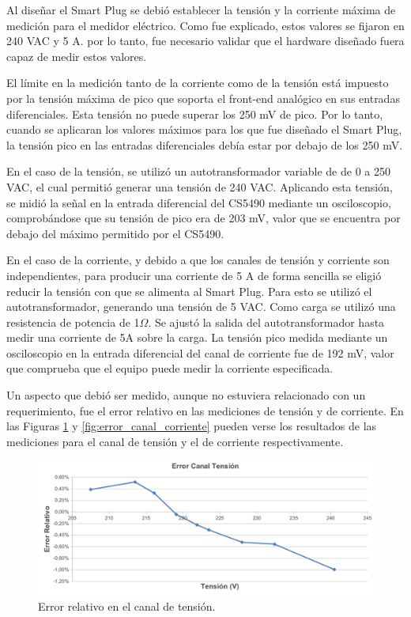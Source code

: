 Al diseñar el Smart Plug se debió establecer la tensión y la corriente máxima de medición para el medidor eléctrico. Como fue explicado, estos valores se fijaron en 240 VAC y 5 A. por lo tanto, fue necesario validar que el hardware diseñado fuera capaz de medir estos valores.

El límite en la medición tanto de la corriente como de la tensión está impuesto por la tensión máxima de pico que soporta el front-end analógico en sus entradas diferenciales. Esta tensión no puede superar los 250 mV de pico. Por lo tanto, cuando se aplicaran los valores máximos para los que fue diseñado el Smart Plug, la tensión pico en las entradas diferenciales debía estar por debajo de los 250 mV.

En el caso de la tensión, se utilizó un autotransformador variable de de 0 a 250 VAC, el cual permitió generar una tensión de 240 VAC. Aplicando esta tensión, se midió la señal en la entrada diferencial del CS5490 mediante un osciloscopio, comprobándose que su tensión de pico era de 203 mV, valor que se encuentra por debajo del máximo permitido por el CS5490.

En el caso de la corriente, y debido a que los canales de tensión y corriente son independientes, para producir una corriente de 5 A de forma sencilla se eligió reducir la tensión con que se alimenta al Smart Plug. Para esto se utilizó el autotransformador, generando una tensión de 5 VAC. Como carga se utilizó una resistencia de potencia de 1$\Omega$. Se ajustó la salida del autotransformador hasta medir una corriente de 5A sobre la carga. La tensión pico medida mediante un osciloscopio en la entrada diferencial del canal de corriente fue de 192 mV, valor que comprueba que el equipo puede medir la corriente especificada.

Un aspecto que debió ser medido, aunque no estuviera relacionado con un requerimiento, fue el error relativo en las mediciones de tensión y de corriente. En las Figuras \ref{fig:error_canal_tensión} y \ref{fig:error_canal_corriente} pueden verse los resultados de las mediciones para el canal de tensión y el de corriente respectivamente.

\begin{figure}[h]
	\centering
	\includegraphics[width=14cm]{./Figures/4_1_1_error_canal_tension.png}
	\caption{Error relativo en el canal de tensión.}
	\label{fig:error_canal_tensión}
\end{figure}

